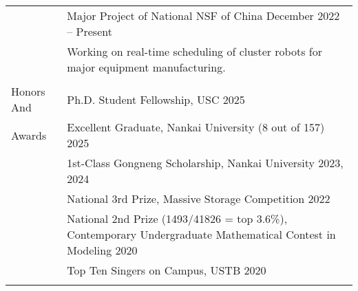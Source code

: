 \documentclass[letterpaper, 10pt]{article}
\begin{document}
\begin{longtable}{p{}p{}}
& {Major Project of National NSF of China} \hfill December 2022 -- Present \\
& Working on real-time scheduling of cluster robots for major equipment manufacturing. \\
& \\



%
%



\nohyphens{\textcolor{OliveGreen}{Honors And}}
& Ph.D. Student Fellowship, USC \hfill 2025 \\
\nohyphens{\textcolor{OliveGreen}{Awards}}
& Excellent Graduate, Nankai University (\textcolor[RGB]{200, 0, 0}{8 out of 157}) \hfill 2025 \\
& 1st-Class Gongneng Scholarship, Nankai University \hfill 2023, 2024 \\
& National 3rd Prize, Massive Storage Competition \hfill 2022 \\
& National 2nd Prize (\textcolor[RGB]{200, 0, 0}{1493/41826 = top 3.6\%}), Contemporary Undergraduate Mathematical Contest in Modeling \hfill 2020 \\
& Top Ten Singers on Campus, USTB \hfill 2020 \\
& \\
 


\end{longtable}
\end{document}
